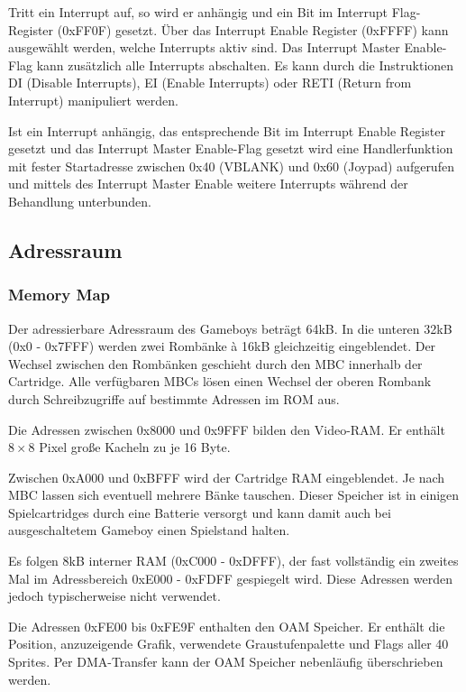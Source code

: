 \documentclass[a4paper]{scrartcl}
\begin{document}
Tritt ein Interrupt auf, so wird er anhängig und ein Bit im Interrupt Flag-Register (0xFF0F) gesetzt.
Über das Interrupt Enable Register (0xFFFF) kann ausgewählt werden, welche Interrupts aktiv sind.
Das Interrupt Master Enable-Flag kann zusätzlich alle Interrupts abschalten. Es kann durch die Instruktionen DI (Disable Interrupts), EI (Enable Interrupts) oder RETI (Return from Interrupt) manipuliert werden.

Ist ein Interrupt anhängig, das entsprechende Bit im Interrupt Enable Register gesetzt und das Interrupt Master Enable-Flag gesetzt wird eine Handlerfunktion mit fester Startadresse zwischen 0x40 (VBLANK) und 0x60 (Joypad) aufgerufen und mittels des Interrupt Master Enable weitere Interrupts während der Behandlung unterbunden.
\subsection{Adressraum}

\subsubsection{Memory Map}

Der adressierbare Adressraum des Gameboys beträgt 64kB. In die unteren 32kB (0x0 - 0x7FFF) werden zwei Rombänke à 16kB gleichzeitig eingeblendet. Der Wechsel zwischen den Rombänken geschieht durch den MBC innerhalb der Cartridge. Alle verfügbaren MBCs lösen einen Wechsel der oberen Rombank durch Schreibzugriffe auf bestimmte Adressen im ROM aus.

Die Adressen zwischen 0x8000 und 0x9FFF bilden den Video-RAM. Er enthält $8 \times 8$ Pixel große Kacheln zu je 16 Byte.

Zwischen 0xA000 und 0xBFFF wird der Cartridge RAM eingeblendet. Je nach MBC lassen sich eventuell mehrere Bänke tauschen. Dieser Speicher ist in einigen Spielcartridges durch eine Batterie versorgt und kann damit auch bei ausgeschaltetem Gameboy einen Spielstand halten.

Es folgen 8kB interner RAM (0xC000 - 0xDFFF), der fast vollständig ein zweites Mal im Adressbereich 0xE000 - 0xFDFF gespiegelt wird. Diese Adressen werden jedoch typischerweise nicht verwendet.

Die Adressen 0xFE00 bis 0xFE9F enthalten den OAM Speicher. Er enthält die Position, anzuzeigende Grafik, verwendete Graustufenpalette und Flags aller 40 Sprites. Per DMA-Transfer kann der OAM Speicher nebenläufig überschrieben werden.
\end{document}
